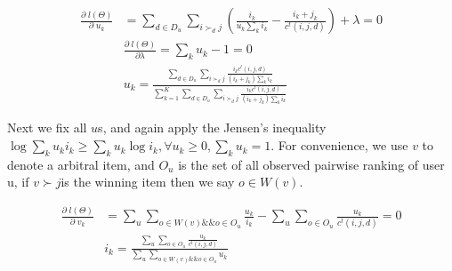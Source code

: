 \documentclass{article}
\begin{document}
\begin{align}
\frac{\partial \;l(\Theta) }{\partial \;u_k}
 &=\sum_{d\in D_u} \sum_{i \succ_d j} (\frac{i_k}{u_k \sum_k i_k}-\frac{i_k+j_k}{c^t(i, j, d)}) + \lambda =0\\
 & \frac{\partial \;l(\Theta) }{\partial \lambda} = \sum_k u_k - 1 =0 \\
 & u_k = \frac{\sum_{d\in D_u} \sum_{i \succ_d j} \frac{i_k c^t(i, j, d)}{(i_k+j_k)\sum_k i_k} }{\sum_{k=1}^K \sum_{d\in D_u} \sum_{i \succ_d j}\frac{i_k c^t(i, j, d)}{(i_k+j_k)\sum_k i_k}}
\end{align}

Next we fix all $u$s, and again apply the Jensen’s inequality $\log \sum_k u_k i_k \geq \sum_k u_k \log i_k,\forall u_k \geq 0,\sum_k u_k=1 $.  For convenience, we use $v$  to denote a arbitral item, and $O_u$  is the set of all observed pairwise ranking of user u, if $ v \succ j $is the winning item then we say $o \in W(v)$.

\begin{align}
\frac{\partial \;l(\Theta) }{\partial \;v_k}
 &=\sum_{u} \sum_{o \in W(v) \&\& o \in O_u} \frac{u_k}{i_k} - \sum_{u} \sum_{o \in O_u} \frac{u_k}{c^t(i, j, d)} =0\\
 & i_k =\frac{\sum_{u} \sum_{o \in O_u} \frac{u_k}{c^t(i, j, d)}}{\sum_{u} \sum_{o \in W(v) \&\& o \in O_u} u_k}
\end{align}
\end{document}
